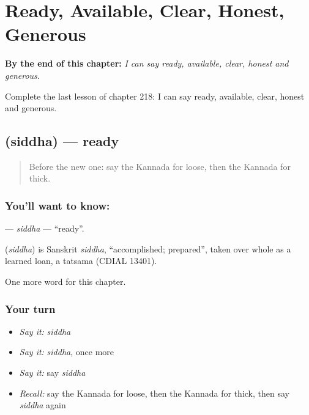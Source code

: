 
\chapter{Ready, Available, Clear, Honest, Generous}
\label{ch:ka-ready-available-clear-honest-generous}

\begin{chapteropening}
\textbf{By the end of this chapter:} \emph{I can say ready, available, clear, honest and generous.}

Complete the last lesson of chapter 218: I can say ready, available, clear, honest and generous.
\end{chapteropening}

\section[\texorpdfstring{\kn{ಸಿದ್ಧ} (siddha)}{ಸಿದ್ಧ (siddha)}]{ (siddha) — ready}

\label{lesson:KA-C218-siddha}



\begin{quote}
Before the new one: say the Kannada for loose, then the Kannada for thick.
\end{quote}

\subsection*{You'll want to know: }
\textbf{} — \emph{siddha} — \textquotedblleft{}ready\textquotedblright{}.

\begin{cousinweb}
\textbf{} (\emph{siddha}) is Sanskrit \emph{siddha}, \textquotedblleft{}accomplished; prepared\textquotedblright{}, taken over whole as a learned loan, a tatsama (CDIAL 13401).
\end{cousinweb}

\begin{grammarlens}[title={What you've built}]
One more word for this chapter.
\end{grammarlens}

\subsection*{Your turn}
\begin{itemize}
\raggedright
  \item \emph{Say it:} \emph{siddha}
  \item \emph{Say it:} \emph{siddha}, once more
  \item \emph{Say it:} say \emph{siddha}
  \item \emph{Recall:} say the Kannada for loose, then the Kannada for thick, then say \emph{siddha} again
\end{itemize}

